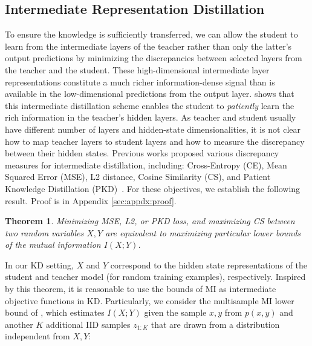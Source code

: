 \documentclass[11pt]{article}
\newtheorem{theorem}{Theorem}
\begin{document}
\subsection{Intermediate Representation Distillation}
To ensure the knowledge is sufficiently transferred, we can allow the student to learn from the intermediate layers of the teacher rather than only the latter's output predictions by minimizing the discrepancies between selected layers from the teacher and the student.
These high-dimensional intermediate layer representations constitute a much richer information-dense signal than is available in the low-dimensional predictions from the output layer. \citep{sun2019patient} shows that this intermediate distillation scheme enables the student to \emph{patiently} learn the rich information in the teacher's hidden layers. As teacher and student usually have different number of layers and hidden-state dimensionalities, it is not clear how to map teacher layers to student layers and how to measure the discrepancy between their hidden states. Previous works proposed various discrepancy measures for intermediate distillation, including:  Cross-Entropy (CE), Mean Squared Error (MSE), L2 distance, Cosine Similarity (CS), and  Patient Knowledge Distillation (PKD)~\citep{sun2019patient}.
For these objectives, we establish the following result. Proof is in  Appendix \ref{sec:appdx:proof}.

\begin{theorem}
Minimizing MSE, L2, or PKD loss, and maximizing CS between two random variables $X,Y$ are equivalent to maximizing particular lower bounds of the mutual information $I(X;Y)$. 
\label{theorem:unify}
\end{theorem} 
In our KD setting, $X$ and $Y$ correspond to the hidden state representations of the student and teacher model (for random training examples), respectively. 
Inspired by this theorem, it is reasonable to use the bounds of MI as intermediate objective functions in KD. 
Particularly, we consider the multisample MI lower bound of  \citep{poole2019variational}, which estimates $I(X;Y)$ given the sample $x, y$ from $p(x, y)$ and another $K$ additional IID samples $z_{1:{K}}$ that are drawn from a distribution independent from $X, Y$:
\end{document}
